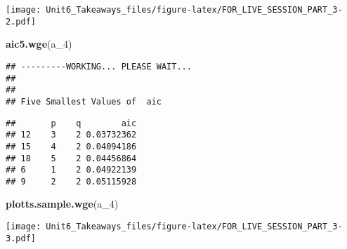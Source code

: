 \documentclass[]{article}
\newenvironment{Shaded}{\begin{snugshade}}{\end{snugshade}}
\newcommand{\DecValTok}[1]{\textcolor[rgb]{0.00,0.00,0.81}{#1}}
\newcommand{\KeywordTok}[1]{\textcolor[rgb]{0.13,0.29,0.53}{\textbf{#1}}}
\newcommand{\NormalTok}[1]{#1}
\begin{document}
\texttt{[image: Unit6\_Takeaways\_files/figure-latex/FOR\_LIVE\_SESSION\_PART\_3-2.pdf]}

\begin{Shaded}
\begin{Highlighting}[]
\KeywordTok{aic5.wge}\NormalTok{(a_}\DecValTok{4}\NormalTok{)}
\end{Highlighting}
\end{Shaded}

\begin{verbatim}
## ---------WORKING... PLEASE WAIT... 
## 
## 
## Five Smallest Values of  aic
\end{verbatim}

\begin{verbatim}
##       p    q        aic
## 12    3    2 0.03732362
## 15    4    2 0.04094186
## 18    5    2 0.04456864
## 6     1    2 0.04922139
## 9     2    2 0.05115928
\end{verbatim}

\begin{Shaded}
\begin{Highlighting}[]
\KeywordTok{plotts.sample.wge}\NormalTok{(a_}\DecValTok{4}\NormalTok{)}
\end{Highlighting}
\end{Shaded}

\texttt{[image: Unit6\_Takeaways\_files/figure-latex/FOR\_LIVE\_SESSION\_PART\_3-3.pdf]}
\end{document}
